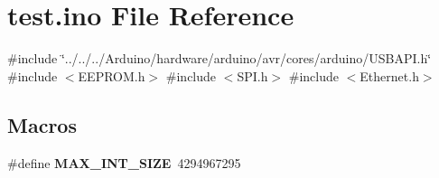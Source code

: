 \hypertarget{test_8ino}{}\section{test.\+ino File Reference}
\label{test_8ino}
{\ttfamily \#include \char`\"{}../../../\+Arduino/hardware/arduino/avr/cores/arduino/\+U\+S\+B\+A\+P\+I.\+h\char`\"{}}\newline
{\ttfamily \#include $<$E\+E\+P\+R\+O\+M.\+h$>$}\newline
{\ttfamily \#include $<$S\+P\+I.\+h$>$}\newline
{\ttfamily \#include $<$Ethernet.\+h$>$}\newline
\subsection*{Macros}
\begin{DoxyCompactItemize}
\item 
\mbox{\label{test_8ino_a774a906ceb2672aee07483be36134011}} 
\#define {\bfseries M\+A\+X\+\_\+\+I\+N\+T\+\_\+\+S\+I\+ZE}~4294967295
\end{DoxyCompactItemize}
